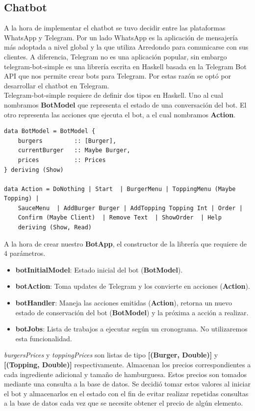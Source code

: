 \documentclass[a4paper,12pt]{article}
\begin{document}
\subsection{Chatbot	}

A la hora de implementar el chatbot se tuvo decidir entre las plataformas WhatsApp y Telegram. Por un lado WhatsApp es la aplicación de mensajería más adoptada a nivel global y la que utiliza Arredondo para comunicarse con sus clientes. A diferencia, Telegram no es una aplicación popular, sin embargo telegram-bot-simple \cite{telegram-bot-simple} es una librería escrita en Haskell basada en la Telegram Bot API \cite{telegram-bot-api} que nos permite crear bots para Telegram. Por estas razón se optó por desarrollar el chatbot en Telegram.
\\
Telegram-bot-simple requiere de definir dos tipos en Haskell. Uno al cual nombramos \textbf{BotModel} que representa el estado de una conversación del bot. El otro representa las acciones que ejecuta el bot, a el cual nombramos \textbf{Action}.

\begin{verbatim}
data BotModel = BotModel {
	burgers         :: [Burger],
	currentBurger   :: Maybe Burger,
	prices          :: Prices
} deriving (Show)

data Action = DoNothing | Start  | BurgerMenu | ToppingMenu (Maybe Topping) |
	SauceMenu  | AddBurger Burger | AddTopping Topping Int | Order |
	Confirm (Maybe Client)  | Remove Text  | ShowOrder  | Help  
	deriving (Show, Read)
\end{verbatim}

A la hora de crear nuestro \textbf{BotApp}, el constructor de la librería que requiere de 4 parámetros.

\begin{itemize}
	\item \textbf{botInitialModel}: Estado inicial del bot (\textbf{BotModel}).
	\item \textbf{botAction}: Toma updates de Telegram y los convierte en acciones (\textbf{Action}).
	\item \textbf{botHandler}: Maneja las acciones emitidas (\textbf{Action}), retorna un nuevo estado de conservación del bot (\textbf{BotModel}) y la próxima a acción a realizar.
	\item \textbf{botJobs}: Lista de trabajos a ejecutar según un cronograma. No utilizaremos esta funcionalidad.
\end{itemize}

\textit{burgersPrices} y \textit{toppingPrices} son listas de tipo  \textbf{[(Burger, Double)]} y \textbf{[(Topping, Double)]} respectivamente. Almacenan los precios correspondientes a cada ingrediente adicional y tamaño de hamburguesa. Estos precios son tomados mediante una consulta a la base de datos. Se decidió tomar estos valores al iniciar el bot y almacenarlos  en el estado con el fin de evitar realizar repetidas consultas a la base de datos cada vez que se necesite obtener el precio de algún elemento.
\end{document}
